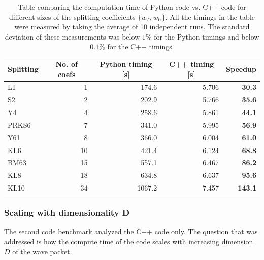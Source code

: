%
\begin{table}[h]
	\centering
	\begin{tabular}{|l | r | r | r | r |} 
		\hline
		\multicolumn{1}{|c}{\textbf{Splitting}} &
		\multicolumn{1}{|c}{\textbf{No. of coefs}} &
		\multicolumn{1}{|c}{\textbf{Python timing [s]}} &
		\multicolumn{1}{|c}{\textbf{C++ timing [s]}} &
		\multicolumn{1}{|c|}{\textbf{Speedup}} \\
		\hline
		LT & 1 & 174.6 & 5.706 &\textbf{30.3} \\ 
		S2 & 2 & 202.9 & 5.766 &\textbf{35.6} \\
		Y4 & 4 & 258.6 & 5.861 &\textbf{44.1} \\
		PRKS6 & 7 & 341.0 & 5.995 &\textbf{56.9} \\ 
		Y61 & 8 & 366.0 & 6.004 &\textbf{61.0} \\
		KL6 & 10 & 421.4 & 6.124 &\textbf{68.8} \\
		BM63 & 15 & 557.1 & 6.467 &\textbf{86.2} \\ 
		KL8 & 18 & 634.8 & 6.637 &\textbf{95.6} \\
		KL10 & 34 & 1067.2 & 7.457 &\textbf{143.1} \\
		\hline
	\end{tabular}
	\label{tab:benchmarksplit}
	\caption{Table comparing the computation time of Python code vs. C++ code for different sizes of the splitting coefficients $\{ w_T, w_U \}$. All the timings in the table were measured by taking the average of 10 independent runs. The standard deviation of these measurements was below $1\%$ for the Python timings and below $0.1\%$ for the C++ timings.}
\end{table}


\subsubsection{Scaling with dimensionality D}
%
The second code benchmark analyzed the C++ code only. The question that was addressed is how the compute time of the code scales with increasing dimension $D$ of the wave packet.

